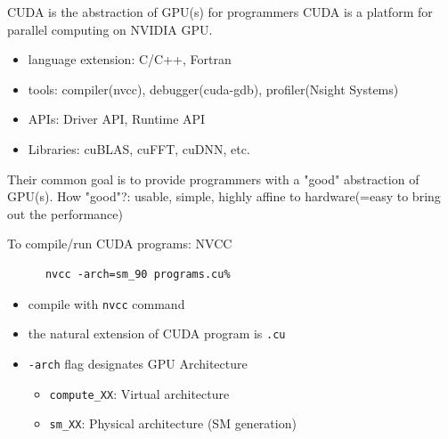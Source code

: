 \documentclass[dvipdfmx, 11pt, aspectratio=169]{beamer}   %
\begin{document}
\begin{frame}{CUDA is the abstraction of GPU(s) for programmers}
  CUDA is a platform for parallel computing on NVIDIA GPU.
  \begin{itemize}
    \item language extension: C/C++, Fortran
    \item tools: compiler(nvcc), debugger(cuda-gdb), profiler(Nsight Systems)
    \item APIs: Driver API, Runtime API
    \item Libraries: cuBLAS, cuFFT, cuDNN, etc.
  \end{itemize}
  Their common goal is to provide programmers with a "good" abstraction of GPU(s).
  How "good"?: usable, simple, highly affine to hardware(=easy to bring out the performance)
\end{frame}
\begin{frame}[fragile]{To compile/run CUDA programs: NVCC}
  \begin{block}{}
    \begin{lstlisting}
      nvcc -arch=sm_90 programs.cu%
\end{lstlisting}
  \end{block}
  \begin{itemize}
    \item compile with \lstinline|nvcc| command
    \item the natural extension of CUDA program is \lstinline|.cu|
    \item \lstinline|-arch| flag designates GPU Architecture
    \begin{itemize}
      \item \lstinline|compute_XX|: Virtual architecture
      \item \lstinline|sm_XX|: Physical architecture (SM generation)
    \end{itemize}
  \end{itemize}
\end{frame}
\end{document}
